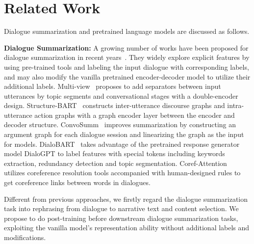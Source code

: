 \section{Related Work}
\label{sec:relatedwork}

Dialogue summarization and pretrained language models are discussed as follows.


\textbf{Dialogue Summarization:} A growing number of works have been proposed for dialogue summarization in recent years~\cite{feng2021survey}. They widely explore explicit features by using pre-trained tools and labeling the input dialogue with corresponding labels, and may also modify the vanilla pretrained encoder-decoder model to utilize their additional labels.
Multi-view~\cite{chen2020multi} proposes to add separators between input utterances by topic segments and conversational stages with a double-encoder design.
Structure-BART~\cite{chen2021structure} constructs inter-utterance discourse graphs and intra-utterance action graphs with a graph encoder layer between the encoder and decoder structure.
ConvoSumm~\cite{fabbri2021convosumm} improves summarization by constructing an argument graph for each dialogue session and linearizing the graph as the input for models.
DialoBART~\cite{feng2021language} takes advantage of the pretrained response generator model DialoGPT\cite{zhang2020dialogpt} to label features with special tokens including keywords extraction, redundancy detection and topic segmentation.
Coref-Attention~\cite{liu2021coreference} utilizes coreference resolution tools accompanied with human-designed rules to get coreference links between words in dialogues.

Different from previous approaches, we firstly regard the dialogue summarization task into rephrasing from dialogue to narrative text and content selection. We propose to do post-training before downstream dialogue summarization tasks, exploiting the vanilla model's representation ability without additional labels and modifications. 



